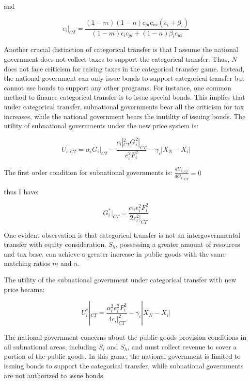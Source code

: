 \documentclass[man]{apa7}
\begin{document}
and

\begin{equation}
  c_i|_{CT}=\frac{(1-m)(1-n)c_{pi}c_{wi}(\epsilon_i+\beta_i)}{(1-m) \epsilon_i c_{pi}+(1-n)\beta_i c_{wi}} \label{666}
\end{equation}

Another crucial distinction of categorical transfer is that I assume the national government does not collect taxes to support the categorical transfer. Thus, $N$ does not face criticism for raising taxes in the categorical transfer game. Instead, the national government can only issue bonds to support categorical transfer but cannot use bonds to support any other programs. For instance, one common method to finance categorical transfer is to issue special bonds. This implies that under categorical transfer, subnational governments bear all the criticism for tax increases, while the national government bears the inutility of issuing bonds. The utility of subnational governments under the new price system is: %

\begin{equation}
  U_i|_{CT}=\alpha_iG_i|_{CT}-\frac{c_i|_{CT}^2G_i^2|_{CT}}{e_i^2F_i^2}-\gamma_i|X_N-X_i|
\end{equation}

The first order condition for subnational governments is:
$\frac{dU_i|_{CT}}{dG_i|_{CT}}=0$

thus I have:

\begin{equation}
  G_i^*|_{CT}=\frac{\alpha_i e_i^2 F_i^2}{2 c_i^2|_{CT}}
\end{equation}

One evident observation is that categorical transfer is not an intergovernmental transfer with equity consideration. $S_h$, possessing a greater amount of resources and tax base, can achieve a greater increase in public goods with the same matching ratios $m$ and $n$.

The utility of the subnational government under categorical transfer with new price became:

\begin{equation}
  U_i^*|_{CT}=\frac{\alpha_i^2 e_i^2 F_i^2}{4c_i|_{CT}^2}-\gamma_i|X_N-X_i|\label{uforsiinct}
\end{equation}

The national government concerns about the public goods provision conditions in all subnational areas, including $S_i$ and $S_h$, and must collect revenue to cover a portion of the public goods. In this game, the national government is limited to issuing bonds to support the categorical transfer, while subnational governments are not authorized to issue bonds.
\end{document}
